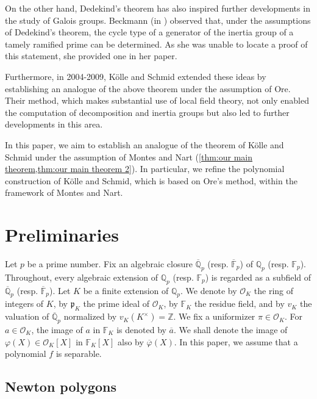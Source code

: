 \documentclass{article}
\newcommand{\field}[1]{\mathbb{#1}}
\newcommand{\Z}{\field{Z}}
\newcommand{\Q}{\field{Q}}
\theoremstyle{definition}
\theoremstyle{remark}
\numberwithin{equation}{section}
\begin{document}
  On the other hand, Dedekind's theorem has also inspired further developments in the study of Galois groups.
  Beckmann (in \cite{MR1271245}) observed that, under the assumptions of Dedekind's theorem, the cycle type of a generator of the inertia group of a tamely ramified prime can be determined.
  As she was unable to locate a proof of this statement, she provided one in her paper.

  Furthermore, in 2004-2009, K\"{o}lle and Schmid extended these ideas by establishing an analogue of the above theorem under the assumption of Ore.
  Their method, which makes substantial use of local field theory, not only enabled the computation of decomposition and inertia groups but also led to further developments in this area.

  In this paper, we aim to establish an analogue of the theorem of K\"{o}lle and Schmid under the assumption of Montes and Nart (\cref{thm:our main theorem,thm:our main theorem 2}).
  In particular, we refine the polynomial construction of K\"{o}lle and Schmid, which is based on Ore's method, within the framework of Montes and Nart. 

\section{Preliminaries}\label{sec:Prelim}

  Let $p$ be a prime number. Fix an algebraic closure $\overline{\Q}_p$ (resp. $\overline{\field{F}}_p$) of $\field{Q}_p$ (resp. $\field{F}_p$). 
  Throughout, every algebraic extension of $\field{Q}_p$ (resp. $\field{F}_p$) is 
  regarded as a subfield of $\overline{\field{Q}}_p$ (resp. $\overline{\field{F}}_p$). 
  Let $K$ be a finite extension of $\field{Q}_p$. We denote by $\mathcal{O}_K$ the ring of integers of $K$, 
  by $\mathfrak{p}_K$ the prime ideal of $\mathcal{O}_K$, by $\field{F}_K$ the residue field, and by $v_K$ the valuation of $\overline{\Q}_p$ 
  normalized by $v_K(K^{\times}) = \Z$. 
  We fix a uniformizer $\pi \in \mathcal{O}_K$. 
  For $a \in \mathcal{O}_K$, the image of $a$ in $\field{F}_K$ is denoted by $\overline{a}$. 
  We shall denote the image of $\varphi(X) \in \mathcal{O}_K [X]$ in $\field{F}_K [X]$ also by $\overline{\varphi}(X)$. 
  In this paper, we assume that a polynomial $f$ is separable.

  \subsection{Newton polygons}\label{sec:Newton polygons}
    
\end{document}
